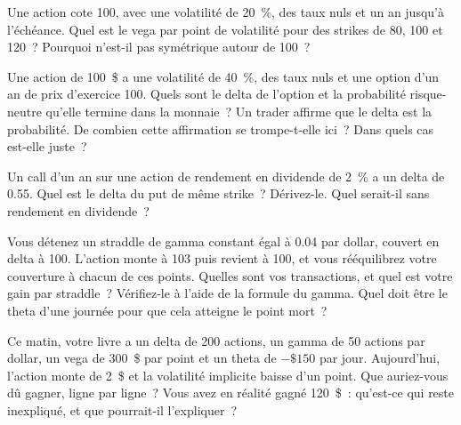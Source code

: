 \begin{question}\label{iq:iv2:options-parity-and-greeks:22}
Une action cote 100, avec une volatilité de 20~\%, des taux nuls et un an jusqu'à l'échéance. Quel est le vega par point de volatilité pour des strikes de 80, 100 et 120~? Pourquoi n'est-il pas symétrique autour de 100~?
\end{question}

\begin{question}\label{iq:iv2:options-parity-and-greeks:23}
Une action de 100~\$ a une volatilité de 40~\%, des taux nuls et une option d'un an de prix d'exercice 100. Quels sont le delta de l'option et la probabilité risque-neutre qu'elle termine dans la monnaie~? Un trader affirme que le delta est la probabilité. De combien cette affirmation se trompe-t-elle ici~? Dans quels cas est-elle juste~?
\end{question}

\begin{question}\label{iq:iv2:options-parity-and-greeks:24}
Un call d'un an sur une action de rendement en dividende de 2~\% a un delta de 0.55. Quel est le delta du put de même strike~? Dérivez-le. Quel serait-il sans rendement en dividende~?
\end{question}

\begin{question}\label{iq:iv2:options-parity-and-greeks:25}
Vous détenez un straddle de gamma constant égal à 0.04 par dollar, couvert en delta à 100. L'action monte à 103 puis revient à 100, et vous rééquilibrez votre couverture à chacun de ces points. Quelles sont vos transactions, et quel est votre gain par straddle~? Vérifiez-le à l'aide de la formule du gamma. Quel doit être le theta d'une journée pour que cela atteigne le point mort~?
\end{question}

\begin{question}\label{iq:iv2:options-parity-and-greeks:26}
Ce matin, votre livre a un delta de 200 actions, un gamma de 50 actions par dollar, un vega de 300~\$ par point et un theta de $-\$150$ par jour. Aujourd'hui, l'action monte de 2~\$ et la volatilité implicite baisse d'un point. Que auriez-vous dû gagner, ligne par ligne~? Vous avez en réalité gagné 120~\$~: qu'est-ce qui reste inexpliqué, et que pourrait-il l'expliquer~?
\end{question}

